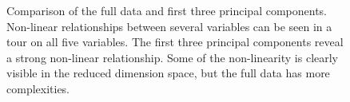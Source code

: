 \documentclass[
  letterpaper,
]{krantz}
\begin{document}
\begin{figure}

\begin{minipage}{0.50\linewidth}



\end{minipage}%
%
\begin{minipage}{0.50\linewidth}



\end{minipage}%

\caption{\label{fig-plane-nonlin-pdf}Comparison of the full data and
first three principal components. Non-linear relationships between
several variables can be seen in a tour on all five variables. The first
three principal components reveal a strong non-linear relationship. Some
of the non-linearity is clearly visible in the reduced dimension space,
but the full data has more complexities.}

\end{figure}%
\end{document}
